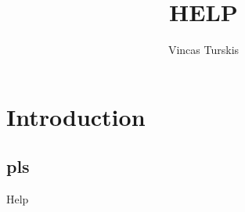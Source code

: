 \documentclass[11pt,a4paper]{report}
\author{Vincas Turskis}
\title{HELP}
\begin{document}
\tableofcontents
\chapter{Introduction}
\section{pls}
Help
\end{document}
